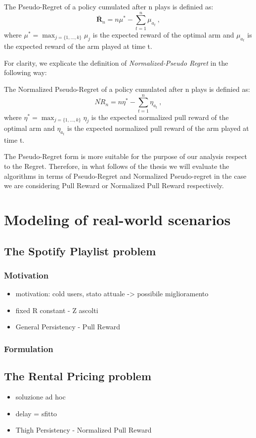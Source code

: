 \begin{definition}
	The Pseudo-Regret of a policy cumulated after n plays is definied as:
		$$\bm\bar{R}_{n}=n{\mu^{*}}- \sum_{t=1}^{n} \mu_{a_t} \ ,$$
	where  $\mu^{*}=\max_{j = \{1,\dots,k\}} \mu_j$ is the expected reward of the optimal arm and $\mu_{a_t}$ is the expected reward of the arm played at time t.
\end{definition}
For clarity, we explicate the definition of \emph{Normalized-Pseudo Regret} in the following way:
\begin{definition}
	The Normalized Pseudo-Regret of a policy cumulated after n plays is definied as:
	$$\bm\bar{\mathit{NR}}_{n}=n{\eta^{*}}- \sum_{t=1}^{n} \eta_{a_t} \ , $$
	where  $\eta^{*}=\max_{j = \{1,\dots,k\}} \eta_j$ is the expected normalized pull reward of the optimal arm and $\eta_{a_t}$ is the expected normalized pull reward of the arm played at time t.
\end{definition}



The Pseudo-Regret form is more suitable for the purpose of our analysis respect to the Regret. Therefore, in what follows of the thesis we will evaluate the algorithms in terms of Pseudo-Regret and Normalized Pseudo-regret in the case we are considering Pull Reward or Normalized Pull Reward respectively.



\section{Modeling of real-world scenarios}
\subsection{The Spotify Playlist problem}
\subsubsection*{Motivation}
\begin{itemize}
	

	\item motivation: cold users, stato attuale -> possibile miglioramento 
	
	
	\item fixed R constant - Z ascolti 
	\item General Persistency - Pull Reward
\end{itemize}
\subsubsection*{Formulation}
\subsection{The Rental Pricing problem}
\begin{itemize}
	\item soluzione ad hoc
	\item delay = sfitto 
	\item Thigh Persistency - Normalized Pull Reward
\end{itemize}
 	





